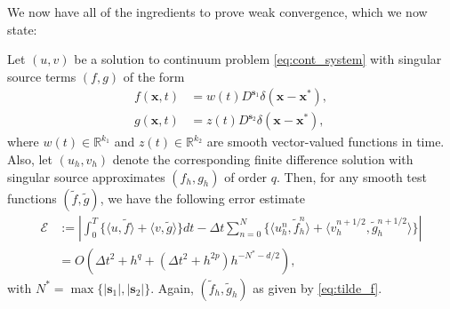 We now have all of the ingredients to prove weak convergence, which we now state:
\begin{theorem}\label{thm:conv}
Let $(u,v)$ be a solution to continuum problem \ref{eq:cont_system} with singular source terms $(f,g)$ of the form
\begin{equation*}
\begin{split}
	f(\mathbf x,t) &=  w(t) D^{\mathbf s_1}\delta(\mathbf x-\mathbf x^*),\\
	g(\mathbf x,t) &= z(t) D^{\mathbf s_2}\delta(\mathbf x-\mathbf x^*),
\end{split}
\end{equation*}
where $w(t)\in\mathbb R^{k_1}$ and $z(t)\in\mathbb R^{k_2}$ are smooth vector-valued functions in time.
Also, let $(u_h,v_h)$ denote the corresponding finite difference solution with singular source approximates $(f_h,g_h)$ of order $q$.
Then, for any smooth test functions $(\tilde f,\tilde g)$, we have the following error estimate
\begin{equation}\label{eq:weak_conv}
\begin{split}
	\mathcal E &:= \left| \int_0^T  \Big\{ \langle u,\tilde f\rangle + \langle v,\tilde g\rangle \Big\} dt -
		\Delta t \sum_{n=0}^N \Big\{ \langle u_h^{n}, \tilde f_h^{n} \rangle +
						 	   \langle v_h^{n+1/2}, \tilde g_h^{n+1/2}  \rangle \Big\} \right|\\
	&= O(\Delta t^2 + h^q + (\Delta t^2+h^{2p})h^{-N^*-d/2}),
\end{split}
\end{equation}
with $N^* = \max\{|\mathbf s_1|,|\mathbf s_2|\}$. 
Again, $(\tilde f_h,\tilde g_h)$ as given by \ref{eq:tilde_f}. 
\end{theorem}

